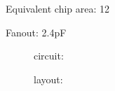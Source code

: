 Equivalent chip area: 12

Fanout: 2.4pF

\begin{figure}[bth]
circuit:\\

\end{figure}



\begin{figure}[bth]
layout:\\

\end{figure}


\clearpage


